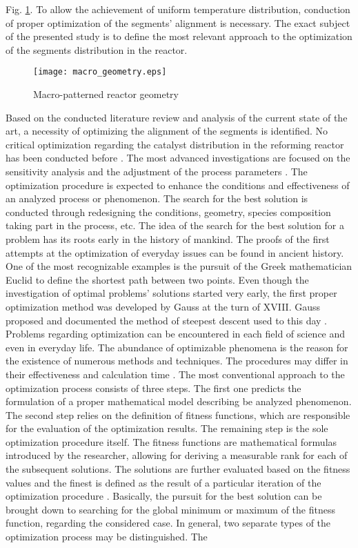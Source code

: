 Fig. \ref{fig:react_pattern}. To allow the achievement of uniform temperature distribution, conduction of proper optimization of the segments' alignment is necessary.  The exact subject of the presented study is to define the most relevant approach to the optimization of the segments distribution in the reactor.


\begin{figure}[h!]
\centering
\texttt{[image: macro\_geometry.eps]}
\caption{\label{fig:react_pattern}{Macro-patterned reactor geometry}}
\end{figure}

\clearpage

Based on the conducted literature review and analysis of the current state of the art, a necessity of optimizing the alignment of the segments is identified. No critical optimization regarding the catalyst distribution in the reforming reactor has been conducted before \cite{Heidebrecht2005, Li2022}. The most advanced investigations are focused on the sensitivity analysis and the adjustment of the process parameters \cite{Rajesh2000, Chen2005, Silva2015}. The optimization procedure is expected to enhance the conditions and effectiveness of an analyzed process or phenomenon. The search for the best solution is conducted through redesigning the conditions, geometry, species composition taking part in the process, etc. The idea of the search for the best solution for a problem has its roots early in the history of mankind. The proofs of the first attempts at the optimization of everyday issues can be found in ancient history.  One of the most recognizable examples is the pursuit of the Greek mathematician Euclid to define the shortest path between two points. Even though the investigation of optimal problems’  solutions started very early, the first proper optimization method was developed by Gauss at the turn of XVIII. Gauss proposed and documented the method of steepest descent used to this day \cite{Curry1944, Meza2010}. Problems regarding optimization can be encountered in each field of science and even in everyday life. The abundance of optimizable phenomena is the reason for the existence of numerous methods and techniques. The procedures may differ in their effectiveness and calculation time \cite{Kusiak2009}. The most conventional approach to the optimization process consists of three steps. The first one predicts the formulation of a proper mathematical model describing be analyzed phenomenon. The second step relies on the definition of fitness functions, which are responsible for the evaluation of the optimization results. The remaining step is the sole optimization procedure itself. The fitness functions are mathematical formulas introduced by the researcher, allowing for deriving a measurable rank for each of the subsequent solutions. The solutions are further evaluated based on the fitness values and the finest is defined as the result of a particular iteration of the optimization procedure \cite{Lange2004}. Basically, the pursuit for the best solution can be brought down to searching for the global minimum or maximum of the fitness function, regarding the considered case. In general, two separate types of the optimization process may be distinguished.  The 